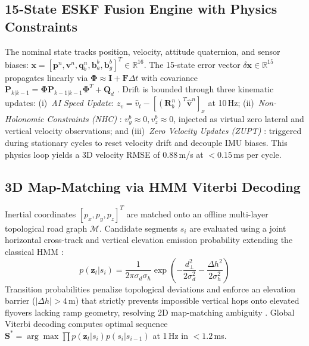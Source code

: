 \documentclass[conference]{IEEEtran}
\begin{document}
\subsection{15-State ESKF Fusion Engine with Physics Constraints}
The nominal state tracks position, velocity, attitude quaternion, and sensor biases: $\mathbf{x} = [\mathbf{p}^n, \mathbf{v}^n, \mathbf{q}_b^n, \mathbf{b}_a^b, \mathbf{b}_g^b]^T \in \mathbb{R}^{16}$. The 15-state error vector $\delta\mathbf{x} \in \mathbb{R}^{15}$ propagates linearly via $\boldsymbol{\Phi} \approx \mathbf{I} + \mathbf{F}\Delta t$ with covariance $\mathbf{P}_{k|k-1} = \boldsymbol{\Phi}\mathbf{P}_{k-1|k-1}\boldsymbol{\Phi}^T + \mathbf{Q}_d$ \cite{sola2017}. Drift is bounded through three kinematic updates:
(i)~\textit{AI Speed Update}: $z_v = \hat{v}_t - [(\mathbf{R}_b^n)^T \hat{\mathbf{v}}^n]_x$ at 10\,Hz;
(ii)~\textit{Non-Holonomic Constraints (NHC)} \cite{dissanayake2001}: $v_y^b \approx 0, v_z^b \approx 0$, injected as virtual zero lateral and vertical velocity observations; and
(iii)~\textit{Zero Velocity Updates (ZUPT)} \cite{foxlin2005}: triggered during stationary cycles to reset velocity drift and decouple IMU biases. This physics loop yields a 3D velocity RMSE of 0.88\,m/s at $<0.15$\,ms per cycle.

\subsection{3D Map-Matching via HMM Viterbi Decoding}
Inertial coordinates $[p_x, p_y, p_z]^T$ are matched onto an offline multi-layer topological road graph $\mathcal{M}$. Candidate segments $s_i$ are evaluated using a joint horizontal cross-track and vertical elevation emission probability extending the classical HMM \cite{newson2009}:
\begin{equation}
p(\mathbf{z}_t|s_i) = \frac{1}{2\pi\sigma_d\sigma_h}\exp\left(-\frac{d_{\perp}^2}{2\sigma_d^2} - \frac{\Delta h^2}{2\sigma_h^2}\right)
\end{equation}
Transition probabilities penalize topological deviations and enforce an elevation barrier ($|\Delta h| > 4$\,m) that strictly prevents impossible vertical hops onto elevated flyovers lacking ramp geometry, resolving 2D map-matching ambiguity \cite{sundar2026, javed2024}. Global Viterbi decoding computes optimal sequence $\mathbf{S}^* = \arg\max \prod p(\mathbf{z}_t|s_i)p(s_i|s_{i-1})$ at 1\,Hz in $<1.2$\,ms.
\end{document}

